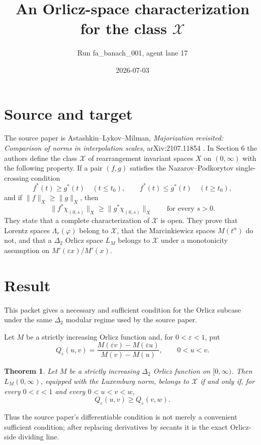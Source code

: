 \documentclass[11pt]{article}
\title{An Orlicz-space characterization for the class \texorpdfstring{$\mathcal X$}{X}}
\author{Run fa\_banach\_001, agent lane 17}
\date{2026-07-03}
\newtheorem{theorem}{Theorem}
\newcommand{\Xclass}{\mathcal X}
\newcommand{\eps}{\varepsilon}
\begin{document}
\maketitle

\section*{Source and target}

The source paper is Astashkin--Lykov--Milman, \emph{Majorization revisited:
Comparison of norms in interpolation scales}, arXiv:2107.11854 \cite{ALM}.
In Section 6 the authors define the class $\Xclass$ of rearrangement invariant
spaces $X$ on $(0,\infty)$ with the following property. If a pair $(f,g)$
satisfies the Nazarov--Podkorytov single-crossing condition
\[
 f^*(t) \ge g^*(t)\quad (t\le t_0),\qquad
 f^*(t) \le g^*(t)\quad (t\ge t_0),
\]
and if $\|f\|_X\ge \|g\|_X$, then
\[
 \|f^*\chi_{(0,s)}\|_X\ge \|g^*\chi_{(0,s)}\|_X
 \qquad\text{for every }s>0.
\]
They state that a complete characterization of $\Xclass$ is open. They prove
that Lorentz spaces $\Lambda_r(\varphi)$ belong to $\Xclass$, that the
Marcinkiewicz spaces $M(t^\alpha)$ do not, and that a $\Delta_2$ Orlicz space
$L_M$ belongs to $\Xclass$ under a monotonicity assumption on
$M'(\eps x)/M'(x)$.

\section*{Result}

This packet gives a necessary and sufficient condition for the Orlicz subcase
under the same $\Delta_2$ modular regime used by the source paper.

Let $M$ be a strictly increasing Orlicz function and, for $0<\eps<1$, put
\[
 Q_\eps(u,v)=
 \frac{M(\eps v)-M(\eps u)}{M(v)-M(u)},\qquad 0<u<v.
\]

\begin{theorem}
\label{thm:orlicz-characterization}
Let $M$ be a strictly increasing $\Delta_2$ Orlicz function on $[0,\infty)$.
Then $L_M(0,\infty)$, equipped with the Luxemburg norm, belongs to
$\Xclass$ if and only if, for every $0<\eps<1$ and every $0<u<v<w$,
\[
 Q_\eps(u,v)\ge Q_\eps(v,w).
\tag{SC}
\label{eq:SC}
\]
\end{theorem}

Thus the source paper's differentiable condition is not merely a convenient
sufficient condition; after replacing derivatives by secants it is the exact
Orlicz-side dividing line.
\end{document}

